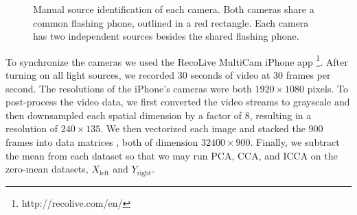 \begin{figure}
  \begin{center}
    \caption{Manual source identification of each camera. Both cameras share a common
      flashing phone, outlined in a red rectangle. Each camera has two independent sources
      besides the shared flashing phone.}
    \label{fig:chpt5:flashing_sources}
  \end{center}
\end{figure}

To synchronize the cameras we used the RecoLive MultiCam iPhone app
\footnote{http://recolive.com/en/}. After turning on all light sources, we recorded 30
seconds of video at 30 frames per second. The resolutions of the iPhone's cameras were
both $1920\times 1080$ pixels. To post-process the video data, we first converted the
video streams to grayscale and then downsampled each spatial dimension by a factor of 8,
resulting in a resolution of $240\times 135$. We then vectorized each image and stacked
the 900 frames into data matrices , both of dimension $32400 \times 900$. Finally, we
subtract the mean from each dataset so that we may run PCA, CCA, and ICCA on the zero-mean
datasets, $X_{\text{left}}$ and $Y_{\text{right}}$. 

